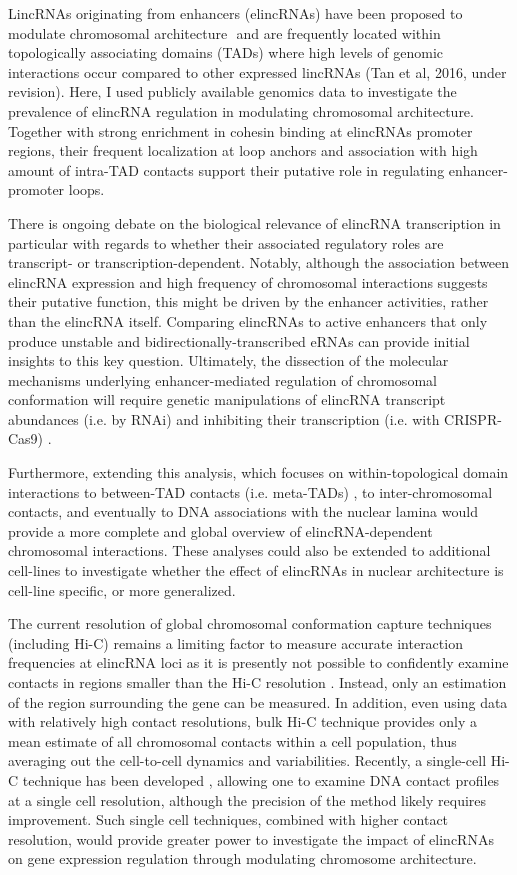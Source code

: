\documentclass[11pt,a4paper]{report}
\begin{document}
LincRNAs originating from enhancers (elincRNAs) have been proposed to modulate chromosomal architecture \cite{Yin2015}⁠ and are frequently located within topologically associating domains (TADs) where high levels of genomic interactions occur compared to other expressed lincRNAs (Tan et al, 2016, under revision). Here, I used publicly available genomics data to investigate the prevalence of elincRNA regulation in modulating chromosomal architecture. Together with strong enrichment in cohesin binding at elincRNAs promoter regions, their frequent localization at loop anchors and association with high amount of intra-TAD contacts support their putative role in regulating enhancer-promoter loops. 

There is ongoing debate on the biological relevance of elincRNA transcription in particular with regards to  whether their associated regulatory roles are transcript- or transcription-dependent. Notably, although the association between elincRNA expression and high frequency of chromosomal interactions suggests their putative function, this might be driven by the enhancer activities, rather than the elincRNA itself. Comparing elincRNAs to active enhancers that only produce unstable and bidirectionally-transcribed eRNAs can provide initial insights to  this key question. Ultimately, the dissection of the molecular mechanisms underlying enhancer-mediated regulation of chromosomal conformation will require genetic manipulations of elincRNA transcript abundances (i.e. by RNAi) and inhibiting their transcription (i.e. with CRISPR-Cas9) \cite{Li2013}⁠.

Furthermore, extending this analysis, which focuses on within-topological domain interactions to between-TAD contacts (i.e. meta-TADs) \cite{Fraser2015}⁠, to inter-chromosomal contacts, and eventually to DNA associations with the nuclear lamina would provide a more complete and global overview of elincRNA-dependent chromosomal interactions. These analyses could also be extended to additional cell-lines to investigate whether the effect of elincRNAs in nuclear architecture is cell-line specific, or more generalized. 

The current resolution of global chromosomal conformation capture techniques (including Hi-C) remains a limiting factor to measure accurate interaction frequencies at elincRNA loci as it is presently not possible to confidently examine contacts in regions smaller than the Hi-C resolution \cite{Rao2014}⁠. Instead, only an estimation of the region surrounding the gene can be measured. In addition, even using data with relatively high contact resolutions, bulk Hi-C technique provides only a mean estimate of all chromosomal contacts within a cell population, thus averaging out the cell-to-cell dynamics and variabilities. Recently, a single-cell Hi-C technique has been developed \cite{Nagano2013}⁠, allowing one to examine DNA contact profiles at a single cell resolution, although the precision of the method likely requires improvement. Such single cell techniques, combined with higher contact resolution, would provide greater power to investigate the impact of elincRNAs on gene expression regulation through modulating chromosome architecture.
\end{document}
